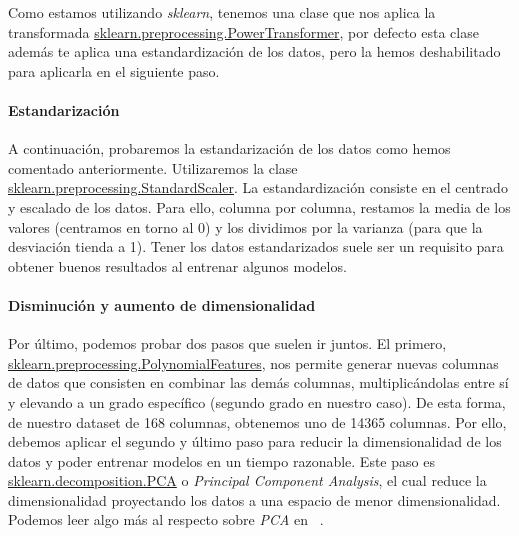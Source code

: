 Como estamos utilizando \textit{sklearn}, tenemos una clase que nos aplica la transformada \href{https://scikit-learn.org/stable/modules/generated/sklearn.preprocessing.PowerTransformer.html}{sklearn.preprocessing.PowerTransformer}, por defecto esta clase además te aplica una estandardización de los datos, pero la hemos deshabilitado para aplicarla en el siguiente paso. 


\paragraph{Estandarización}

A continuación, probaremos la estandarización de los datos como hemos comentado anteriormente. Utilizaremos la clase \href{https://scikit-learn.org/stable/modules/generated/sklearn.preprocessing.StandardScaler.html}{sklearn.preprocessing.StandardScaler}. La estandardización consiste en el centrado y escalado de los datos. Para ello, columna por columna, restamos la media de los valores (centramos en torno al 0) y los dividimos por la varianza (para que la desviación tienda a 1). Tener los datos estandarizados suele ser un requisito para obtener buenos resultados al entrenar algunos modelos.\ \cite{sklearnp24:online}


\paragraph{Disminución y aumento de dimensionalidad}

Por último, podemos probar dos pasos que suelen ir juntos. El primero, \href{https://scikit-learn.org/stable/modules/generated/sklearn.preprocessing.PolynomialFeatures.html}{sklearn.preprocessing.PolynomialFeatures}, nos permite generar nuevas columnas de datos que consisten en combinar las demás columnas, multiplicándolas entre sí y elevando a un grado específico (segundo grado en nuestro caso). De esta forma, de nuestro \gls{dataset} de 168 columnas, obtenemos uno de 14365 columnas. Por ello, debemos aplicar el segundo y último paso para reducir la dimensionalidad de los datos y poder entrenar modelos en un tiempo razonable. Este paso es \href{https://scikit-learn.org/stable/modules/generated/sklearn.decomposition.PCA.html}{sklearn.decomposition.PCA} o \textit{Principal Component Analysis}, el cual reduce la dimensionalidad proyectando los datos a una espacio de menor dimensionalidad. Podemos leer algo más al respecto sobre \textit{PCA} en \ \cite{Principa62:online}. 